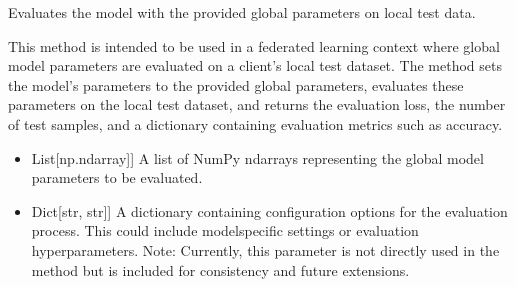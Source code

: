 \documentclass[letterpaper,10pt,english]{sphinxmanual}
\begin{document}
\begin{fulllineitems}
\begin{description}
\begin{itemize}
\end{itemize}

\end{description}

\begin{fulllineitems}
\label{\detokenize{insur_FL_client:insur_FL_client.ClaimsFrequencyFLClient.evaluate}}
\pysigstartsignatures
{}
\pysigstopsignatures
\sphinxAtStartPar
Evaluates the model with the provided global parameters on local test data.

\sphinxAtStartPar
This method is intended to be used in a federated learning context where global model parameters are evaluated
on a client’s local test dataset. The method sets the model’s parameters to the provided global parameters, evaluates
these parameters on the local test dataset, and returns the evaluation loss, the number of test samples, and a dictionary
containing evaluation metrics such as accuracy.
\begin{description}
\begin{itemize}
\item {} \begin{description}
\sphinxlineitem{parameters}{[}List{[}np.ndarray{]}{]}
\sphinxAtStartPar
A list of NumPy ndarrays representing the global model parameters to be evaluated.

\end{description}

\item {} \begin{description}
\sphinxlineitem{config}{[}Dict{[}str, str{]}{]}
\sphinxAtStartPar
A dictionary containing configuration options for the evaluation process. This could include model\sphinxhyphen{}specific settings or evaluation hyperparameters. Note: Currently, this parameter is not directly used in the method but is included for consistency and future extensions.


\end{description}
\end{itemize}
\end{description}
\end{fulllineitems}
\end{fulllineitems}
\end{document}
